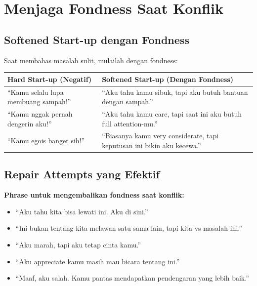 \section{Menjaga Fondness Saat Konflik}

\subsection{Softened Start-up dengan Fondness}

Saat membahas masalah sulit, mulailah dengan fondness:

\begin{center}
\renewcommand{\arraystretch}{1.5}
\begin{tabular}{|>{\raggedright}p{6cm}|>{\raggedright\arraybackslash}p{8cm}|}
\hline
\rowcolor{accent!20}
\textbf{Hard Start-up (Negatif)} & \textbf{Softened Start-up (Dengan Fondness)} \\
\hline
``Kamu selalu lupa membuang sampah!'' & ``Aku tahu kamu sibuk, tapi aku butuh bantuan dengan sampah.'' \\
\hline
``Kamu nggak pernah dengerin aku!'' & ``Aku tahu kamu care, tapi saat ini aku butuh full attention-mu.'' \\
\hline
``Kamu egois banget sih!'' & ``Biasanya kamu very considerate, tapi keputusan ini bikin aku kecewa.'' \\
\hline
\end{tabular}
\end{center}

\subsection{Repair Attempts yang Efektif}

\begin{praktikbox}
\textbf{Phrase untuk mengembalikan fondness saat konflik:}
\begin{itemize}
    \item ``Aku tahu kita bisa lewati ini. Aku di sini.''
    \item ``Ini bukan tentang kita melawan satu sama lain, tapi kita vs masalah ini.''
    \item ``Aku marah, tapi aku tetap cinta kamu.''
    \item ``Aku appreciate kamu masih mau bicara tentang ini.''
    \item ``Maaf, aku salah. Kamu pantas mendapatkan pendengaran yang lebih baik.''
\end{itemize}
\end{praktikbox}

